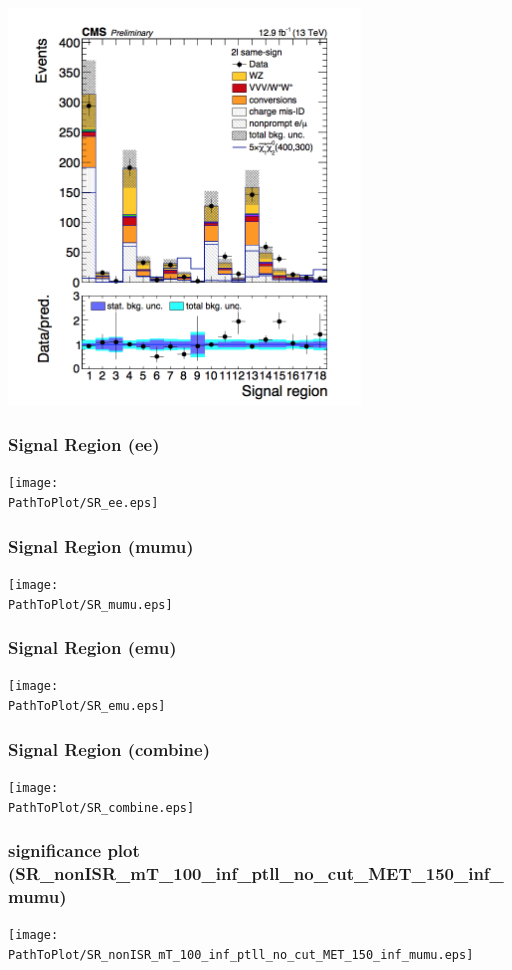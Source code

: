 \documentclass[mathserif,serif]{beamer}
\begin{document}
\begin{frame}
\includegraphics[width=0.7\textwidth]{data/photo/BG.png}
\end{frame}

\def \PathToPlot {../plot}
\begin{frame}
\frametitle{Signal Region (ee)}
\texttt{[image: \\PathToPlot/SR\_ee.eps]}
\end{frame}

\begin{frame}
\frametitle{Signal Region (mumu)}
\texttt{[image: \\PathToPlot/SR\_mumu.eps]}
\end{frame}

\begin{frame}
\frametitle{Signal Region (emu)}
\texttt{[image: \\PathToPlot/SR\_emu.eps]}
\end{frame}

\begin{frame}
\frametitle{Signal Region (combine)}
\texttt{[image: \\PathToPlot/SR\_combine.eps]}
\end{frame}

\begin{frame}
\frametitle{significance plot (SR\_nonISR\_mT\_100\_inf\_ptll\_no\_cut\_MET\_150\_inf\_mumu)}
\texttt{[image: \\PathToPlot/SR\_nonISR\_mT\_100\_inf\_ptll\_no\_cut\_MET\_150\_inf\_mumu.eps]}
\end{frame}
\end{document}
